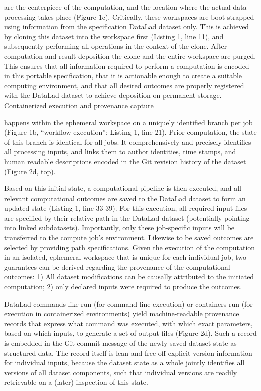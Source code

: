are the centerpiece of the computation, and the location where the actual data processing takes place (Figure 1c). Critically, these workspaces are boot-strapped using information from the specification DataLad dataset only. This is achieved by cloning this dataset into the workspace first (Listing 1, line 11), and subsequently performing all operations in the context of the clone. After computation and result deposition the clone and the entire workspace are purged. This ensures that all information required to perform a computation is encoded in this portable specification, that it is actionable enough to create a suitable computing environment, and that all desired outcomes are properly registered with the DataLad dataset to achieve deposition on permanent storage.
Containerized execution and provenance capture

happens within the ephemeral workspace on a uniquely identified branch per job (Figure 1b, “workflow execution”; Listing 1, line 21). Prior computation, the state of this branch is identical for all jobs. It comprehensively and precisely identifies all processing inputs, and links them to author identities, time stamps, and human readable descriptions encoded in the Git revision history of the dataset (Figure 2d, top).

Based on this initial state, a computational pipeline is then executed, and all relevant computational outcomes are saved to the DataLad dataset to form an updated state (Listing 1, line 33-39). For this execution, all required input files are specified by their relative path in the DataLad dataset (potentially pointing into linked subdatasets). Importantly, only these job-specific inputs will be transferred to the compute job’s environment. Likewise to be saved outcomes are selected by providing path specifications. Given the execution of the computation in an isolated, ephemeral workspace that is unique for each individual job, two guarantees can be derived regarding the provenance of the computational outcomes: 1) All dataset modifications can be causally attributed to the initiated computation; 2) only declared inputs were required to produce the outcomes.

DataLad commands like run (for command line execution) or containers-run (for execution in containerized environments) yield machine-readable provenance records that express what command was executed, with which exact parameters, based on which inputs, to generate a set of output files (Figure 2d). Such a record is embedded in the Git commit message of the newly saved dataset state as structured data. The record itself is lean and free off explicit version information for individual inputs, because the dataset state as a whole jointly identifies all versions of all dataset components, such that individual versions are readily retrievable on a (later) inspection of this state.


